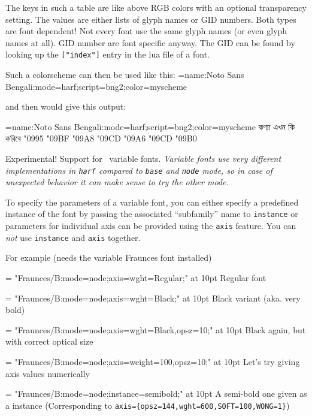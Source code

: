           The keys in such a table are like above RGB colors with an optional transparency setting.
          The values are either lists of glyph names or GID numbers.
          Both types are font dependent! Not every font use the same
          glyph names (or even glyph names at all). GID number are font specific anyway. The GID can be found
          by looking up the \verb+["index"]+ entry in the lua file of a font.

          Such a colorscheme can then be used like this:
          \beginlisting
          \font\test={name:Noto Sans Bengali:mode=harf;script=bng2;color=myscheme}
          \endlisting

          and then would give this output:


          {\font\test={name:Noto Sans Bengali:mode=harf;script=bng2;color=myscheme}\test
           কণ্যা এখন কি করিবে
           \char"0995 \char"09BF
           \char"09A8 \char"09CD \char"09A6
           \char"09CD \char"09B0}

  \endaltitem


    Experimental! Support for \OpenType\
    variable fonts. \emph{Variable fonts use very different implementations in
      \texttt{harf} compared to \texttt{base} and \texttt{node} mode, so in
      case of unexpected behavior it can make sense to try the other mode.}

    To specify the parameters of a variable font, you can either specify a
    predefined instance of the font by passing the associated
    \enquote{subfamily} name to \texttt{instance} or parameters for individual
    axis can be provided using the \texttt{axis} feature. You can \emph{not}
    use \texttt{instance} and \texttt{axis} together.

    For example (needs the variable Fraunces font installed)

         \beginlisting
           \def\fraunces#1#2{%
             \font\varfont = "Fraunces/B:mode=node;#1;" at #2pt\varfont
           }
           \fraunces{axis={wght=Regular}}{10}Regular font\par
           \fraunces{axis={wght=Black}}{10}Black variant (aka. very bold)\par
           \fraunces{axis={wght=Black,opsz=10}}{10}Black again, but with
           correct optical size\par
           \fraunces{axis={weight=100,opsz=10}}{10}Let's try giving axis values
           numerically\par
           \fraunces{instance=semibold}{10}A semi-bold one given as
           a instance
           (Corresponding to
           \verb|axis={opsz=144,wght=600,SOFT=100,WONG=1}|)\par
         \endlisting

